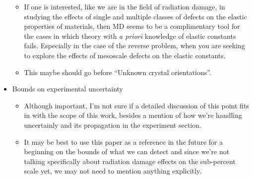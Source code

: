 \begin{itemize}
\begin{itemize}
	\item If one is interested, like we are in the field of radiation damage, in studying the effects of single and multiple classes of defects on the elastic properties of materials, then MD seems to be a complimentary tool for the cases in which theory with \emph{a priori} knowledge of elastic constants fails. Especially in the case of the reverse problem, when you are seeking to explore the effects of mesoscale defects on the elastic constants.
	\item This maybe should go before ``Unknown crystal orientations''.
	\end{itemize}
\item Bounds on experimental uncertainty
	\begin{itemize}
	\item Although important, I'm not sure if a detailed discussion of this point fits in with the scope of this work, besides a mention of how we're handling uncertainly and its propagation in the experiment section. 
	\item It may be best to use this paper as a reference in the future for a beginning on the bounds of what we can detect and since we're not talking specifically about radiation damage effects on the sub-percent scale yet, we may not need to mention anything explicitly.
	\end{itemize}
\end{itemize}

